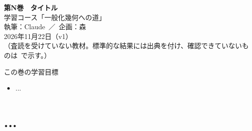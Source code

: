 

\sloppy
\begin{center}
{\LARGE\bfseries\sffamily 第N巻　タイトル}\\[8pt]
{\large 学習コース「一般化幾何への道」}\\[6pt]
{\large 執筆：Claude\ ／\ 企画：森}\\[3pt]
2026年11月22日（v1）\\[3pt]
{\small （査読を受けていない教材。標準的な結果には出典を付け、確認できていないものは\tQ\ で示す。）}
\end{center}
\begin{goalbox}{この巻の学習目標}
\begin{itemize}\item ...\end{itemize}
\end{goalbox}
\tableofcontents
\section{...}

